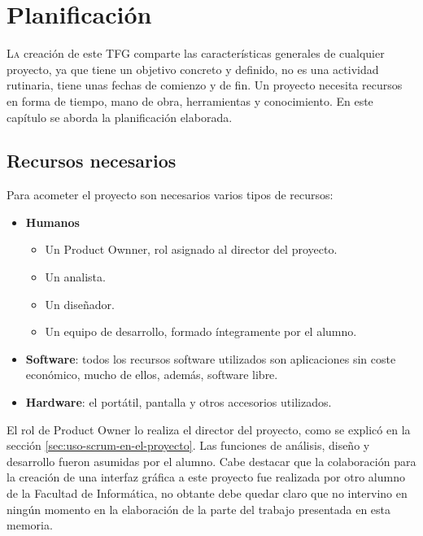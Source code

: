 
\chapter{Planificación}
\label{chap:planificación}

\lettrine{L}{a} creación de este TFG comparte las características generales de cualquier proyecto, ya que tiene un objetivo concreto y definido, no es una actividad rutinaria, tiene unas fechas de comienzo y de fin. Un proyecto necesita recursos en forma de tiempo, mano de obra, herramientas y conocimiento. En este capítulo se aborda la planificación elaborada.


\section{Recursos necesarios}

Para acometer el proyecto son necesarios varios tipos de recursos:

\begin{itemize}
    \item \textbf{Humanos}
        \begin{itemize}
            \item Un Product Ownner, rol asignado al director del proyecto.
            \item Un analista.
            \item Un diseñador.
            \item Un equipo de desarrollo, formado íntegramente por el alumno.
        \end{itemize}
    \item \textbf{Software}: todos los recursos software utilizados son aplicaciones sin coste económico, mucho de ellos, además, software libre.
    \item \textbf{Hardware}: el portátil, pantalla y otros accesorios utilizados.
\end{itemize}

El rol de Product Owner lo realiza el director del proyecto, como se explicó en la sección \ref{sec:uso-scrum-en-el-proyecto}. Las funciones de análisis, diseño y desarrollo fueron asumidas por el alumno. Cabe destacar que la colaboración para la creación de una interfaz gráfica a este proyecto fue realizada por otro alumno de la Facultad de Informática, no obtante debe quedar claro que no intervino en ningún momento en la elaboración de la parte del trabajo presentada en esta memoria.

